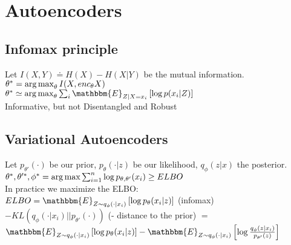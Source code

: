\section{Autoencoders}
\subsection*{Infomax principle}
Let $I(X, Y) \doteq H(X) - H(X\vert Y)$ be the mutual information.\\
$\theta^* = \operatorname*{arg\,max}_\theta I(X, {enc}_\theta X)$\\
$\theta^* \simeq \argmax_\theta \sum_i\mathbbm{E}_{Z | X=x_{i}} \left[\log p(x_i\vert Z)\right] $\\
Informative, but not Disentangled and Robust
\subsection*{Variational Autoencoders}
Let $p_{\theta'}(\cdot)$ be our prior, $p_\theta(\cdot\vert z)$ be our likelihood, $q_\phi(z\vert x)$ the posterior.\\
$\theta^*, \theta'^*,\phi^* = \operatorname*{arg\,max} \sum_{i=1}^n \log p_{\theta, \theta'}(x_i) \geq ELBO$ \\In practice we maximize the ELBO: \\
$ELBO = \mathbbm{E}_{Z \sim q_\phi(\cdot | x_i)}\left[\log{p_\theta (x_i\vert z)}\right]$ (infomax) 
$-KL\left(q_\phi(\cdot|x_i)\vert \vert p_{\theta'}(\cdot)\right)$ (- distance to the prior)
$=$ \\
$\mathbbm{E}_{Z \sim q_\phi(\cdot | x_i)}\left[\log{p_\theta (x_i\vert z)}\right]-\mathbbm{E}_{Z \sim q_\phi(\cdot | x_i)}\left[\log{\frac{q_\phi(z|x_i)}{p_{\theta'} (z)}}\right]$
